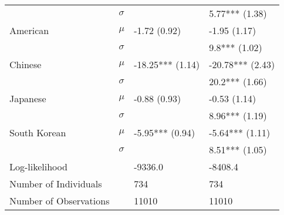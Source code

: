 \begin{tabular}{llll}
                          &  $\sigma$ &                               &                5.77*** (1.38) \\
                 American &     $\mu$ &                  -1.72 (0.92) &                  -1.95 (1.17) \\
                          &  $\sigma$ &                               &                 9.8*** (1.02) \\
                  Chinese &     $\mu$ &              -18.25*** (1.14) &              -20.78*** (2.43) \\
                          &  $\sigma$ &                               &                20.2*** (1.66) \\
                 Japanese &     $\mu$ &                  -0.88 (0.93) &                  -0.53 (1.14) \\
                          &  $\sigma$ &                               &                8.96*** (1.19) \\
             South Korean &     $\mu$ &               -5.95*** (0.94) &               -5.64*** (1.11) \\
                          &  $\sigma$ &                               &                8.51*** (1.05) \\
    \hline Log-likelihood &           &                       -9336.0 &                       -8408.4 \\
    Number of Individuals &           &                           734 &                           734 \\
   Number of Observations &           &                         11010 &                         11010 \\
\bottomrule
\end{tabular}
